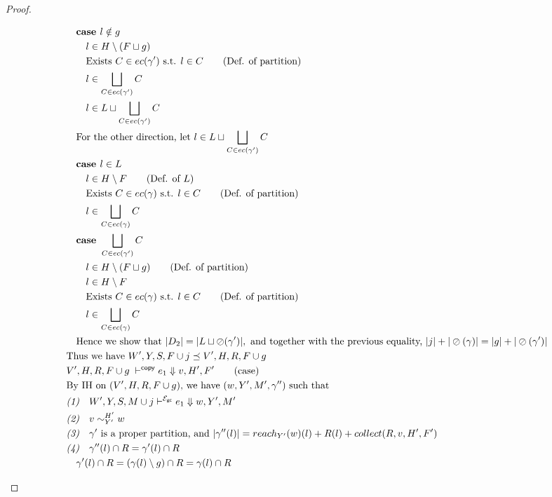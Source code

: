 \documentclass[11pt]{article}
\newcommand{\ms}[1]{\ensuremath{\mathsf{#1}}}
\newcommand{\veq}[4]{#3 \sim^{#1}_{#2} #4}
\newcommand{\oh}[1]{\oslash(#1)}
\newcommand{\gcSem}{\ensuremath{\mathcal{E}_{\ms{gc}}}}
\theoremstyle{definition}
\begin{document}
\begin{proof}
\begin{description}
\begin{align*}
		&\quad \textbf{case } l \notin g\\
		&\quad\quad l \in H \setminus (F \sqcup g)\\
		&\quad\quad \text{Exists } C \in ec(\gamma') \text{ s.t. } l \in C \tag{Def. of partition}\\
		&\quad\quad l \in \bigsqcup_{C \in ec(\gamma')} C\\
		&\quad\quad l \in L \sqcup \bigsqcup_{C \in ec(\gamma')} C\\
		&\quad\text{For the other direction, let } l \in L \sqcup \bigsqcup_{C \in ec(\gamma')} C\\
		&\quad\textbf{case } l \in L\\
		&\quad\quad l \in H \setminus F \tag{Def. of $L$}\\
		&\quad\quad \text{Exists } C \in ec(\gamma) \text{ s.t. } l \in C \tag{Def. of partition}\\
		&\quad\quad l \in \bigsqcup_{C \in ec(\gamma)} C\\
		&\quad\textbf{case } \bigsqcup_{C \in ec(\gamma')} C\\
		&\quad\quad l \in H \setminus (F \sqcup g) \tag{Def. of partition}\\
		&\quad\quad l \in H \setminus F \\
		&\quad\quad \text{Exists } C \in ec(\gamma) \text{ s.t. } l \in C \tag{Def. of partition}\\
		&\quad\quad l \in \bigsqcup_{C \in ec(\gamma)} C\\
		&\quad\text{Hence we show that } |D_2| = |L \sqcup \oh{\gamma'}|, \text{ and together with the previous 
		equality, } |j| + |\oh{\gamma}| = |g| + |\oh{\gamma'}|\\
		&\text{Thus we have } W',Y,S,F \cup j \preceq V',H,R,F \cup g\\
  	&V',H,R,F \cup g\; \vdash^{\mathsf{copy}} e_1 \Downarrow v, H',F' \tag{case}\\
		&\text{By IH on $(V',H,R,F\cup g)$, we have } (w,Y',M',\gamma'') \text{ such that }\\
		&\emph{(1)}\quad  W',Y,S,M \cup j  \vdash^{\gcSem} e_1 \Downarrow w,Y',M'\\
		&\emph{(2)}\quad \veq{H'}{Y'}{v}{w}\\
		&\emph{(3)}\quad \gamma' \text{ is a proper partition, and } |\gamma''(l)| = 
			reach_{Y'}(w)(l) + R(l) + collect(R,v,H',F')\\
		&\emph{(4)}\quad \gamma''(l) \cap R = \gamma'(l) \cap R \\
		&\quad \gamma'(l) \cap R = (\gamma(l) \setminus g) \cap R= \gamma(l) \cap R\\

\end{align*}
\end{description}
\end{proof}
\end{document}
